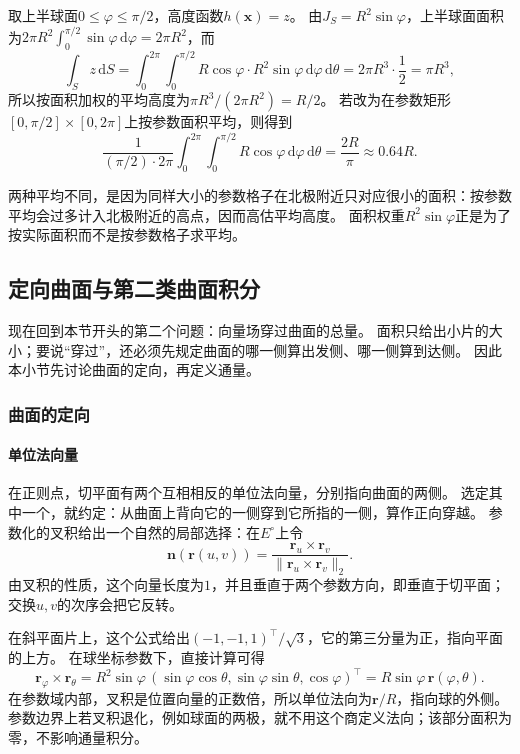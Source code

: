 \begin{example}[上半球面的平均高度]
\label{ex:analysis-hemisphere-average-height}
取上半球面$0\leq\varphi\leq\pi/2$，高度函数$h(\bm x)=z$。
由$J_S=R^2\sin\varphi$，上半球面面积为$2\pi R^2\int_0^{\pi/2}\sin\varphi\,\mathrm d\varphi=2\pi R^2$，而
\[
 \int_Sz\,\mathrm dS
 =\int_0^{2\pi}\int_0^{\pi/2}R\cos\varphi\cdot R^2\sin\varphi\,\mathrm d\varphi\,\mathrm d\theta
 =2\pi R^3\cdot\frac12=\pi R^3,
\]
所以按面积加权的平均高度为$\pi R^3/(2\pi R^2)=R/2$。
若改为在参数矩形$[0,\pi/2]\times[0,2\pi]$上按参数面积平均，则得到
\[
 \frac1{(\pi/2)\cdot2\pi}\int_0^{2\pi}\int_0^{\pi/2}R\cos\varphi\,\mathrm d\varphi\,\mathrm d\theta
 =\frac{2R}{\pi}\approx0.64R.
\]
\end{example}

两种平均不同，是因为同样大小的参数格子在北极附近只对应很小的面积：按参数平均会过多计入北极附近的高点，因而高估平均高度。
面积权重$R^2\sin\varphi$正是为了按实际面积而不是按参数格子求平均。

\subsection{定向曲面与第二类曲面积分}

现在回到本节开头的第二个问题：向量场穿过曲面的总量。
面积只给出小片的大小；要说“穿过”，还必须先规定曲面的哪一侧算出发侧、哪一侧算到达侧。
因此本小节先讨论曲面的定向，再定义通量。

\subsubsection{曲面的定向}

\paragraph{单位法向量}

在正则点，切平面有两个互相相反的单位法向量，分别指向曲面的两侧。
选定其中一个，就约定：从曲面上背向它的一侧穿到它所指的一侧，算作正向穿越。
参数化的叉积给出一个自然的局部选择：在$E^\circ$上令
\[
 \bm n(\bm r(u,v))
 =\frac{\bm r_u\times\bm r_v}{\lVert\bm r_u\times\bm r_v\rVert_2}.
\]
由叉积的性质，这个向量长度为$1$，并且垂直于两个参数方向，即垂直于切平面；交换$u,v$的次序会把它反转。

在斜平面片上，这个公式给出$(-1,-1,1)^\top/\sqrt3$，它的第三分量为正，指向平面的上方。
在球坐标参数下，直接计算可得
\[
 \bm r_\varphi\times\bm r_\theta
 =R^2\sin\varphi\,(\sin\varphi\cos\theta,\sin\varphi\sin\theta,\cos\varphi)^\top
 =R\sin\varphi\,\bm r(\varphi,\theta).
\]
在参数域内部，叉积是位置向量的正数倍，所以单位法向为$\bm r/R$，指向球的外侧。
参数边界上若叉积退化，例如球面的两极，就不用这个商定义法向；该部分面积为零，不影响通量积分。


